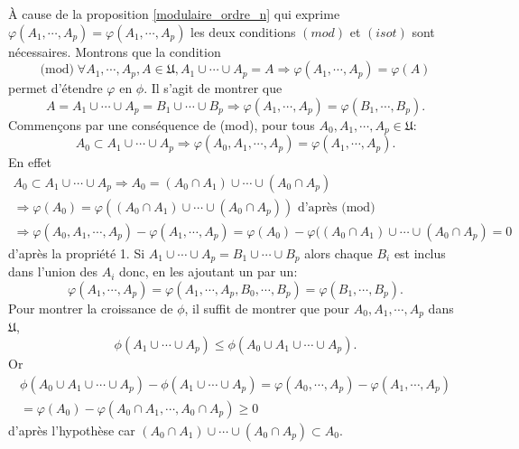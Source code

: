 \begin{demo}
  À cause de la proposition \ref{modulaire_ordre_n} qui exprime $\varphi(A_1, \cdots, A_p) = \varphi(A_1,\cdots,A_p)$ les deux conditions $(mod)$ et $(isot)$ sont nécessaires.\newline
  Montrons que la condition 
  \begin{displaymath}
    \text{(mod)} \; \forall A_1, \cdots,A_p,A \in \mathfrak{U}, A_1 \cup \cdots \cup A_p = A \Rightarrow
    \varphi(A_1, \cdots,A_p) = \varphi(A)
  \end{displaymath}
  permet d'étendre $\varphi$ en $\phi$. Il s'agit de montrer que 
  \begin{displaymath}
    A = A_1 \cup \cdots \cup A_p = B_1 \cup \cdots \cup B_p \Rightarrow \varphi(A_1, \cdots, A_p) = \varphi(B_1, \cdots, B_p).
  \end{displaymath}
  Commençons par une conséquence de (mod), pour tous $A_0, A_1, \cdots, A_p \in \mathfrak{U}$:
  \begin{displaymath}
    A_0 \subset A_1 \cup \cdots \cup A_p \Rightarrow \varphi(A_0,A_1, \cdots, A_p) = \varphi(A_1, \cdots, A_p).
  \end{displaymath}
  En effet 
  \begin{align*}
    A_0 \subset A_1 \cup \cdots \cup A_p \Rightarrow A_0 = (A_0\cap A_1) \cup \cdots \cup (A_0 \cap A_p) \\
      \Rightarrow \varphi(A_0) = \varphi((A_0\cap A_1) \cup \cdots \cup (A_0 \cap A_p)) \text{ d'après (mod)} \\
      \Rightarrow \varphi(A_0,A_1, \cdots, A_p) - \varphi(A_1, \cdots, A_p) = \varphi(A_0) - \varphi((A_0\cap A_1) \cup \cdots \cup (A_0 \cap A_p) = 0
  \end{align*}
  d'après la propriété 1. Si $A_1 \cup \cdots \cup A_p = B_1 \cup \cdots \cup B_p$ alors chaque $B_i$ est inclus dans l'union des $A_i$ donc, en les ajoutant un par un:
  \begin{displaymath}
    \varphi(A_1, \cdots, A_p) = \varphi(A_1, \cdots, A_p, B_0, \cdots, B_p) = \varphi(B_1, \cdots, B_p).
  \end{displaymath}
  Pour montrer la croissance de $\phi$, il suffit de montrer que pour $A_0, A_1, \cdots, A_p$ dans $\mathfrak{U}$,
  \begin{displaymath}
    \phi(A_1\cup \cdots \cup A_p) \leq \phi(A_0 \cup A_1 \cup \cdots \cup A_p).
  \end{displaymath}
  Or 
  \begin{align*}
    \phi(A_0 \cup A_1 \cup \cdots \cup A_p) - \phi(A_1\cup \cdots \cup A_p) 
    = \varphi(A_0, \cdots, A_p) - \varphi(A_1, \cdots, A_p)\\
    = \varphi(A_0) - \varphi(A_0\cap A_1, \cdots, A_0\cap A_p) \geq 0
  \end{align*}
d'après l'hypothèse car $(A_0 \cap A_1) \cup \cdots \cup (A_0\cap A_p) \subset A_0$.
\end{demo}

